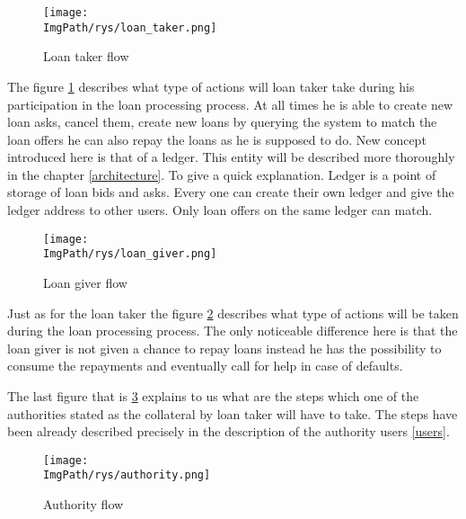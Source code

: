 \documentclass[a4paper,12pt,twoside,openany]{report}
\newcommand{\ImgPath}{.}
\begin{document}
\begin{figure}[!htbp]
	\begin{center}
\centering
\texttt{[image: \\ImgPath/rys/loan\_taker.png]}
\end{center}
	\caption{Loan taker flow}
	\label{loan taker}
\end{figure}

\newpage

The figure \ref{loan taker} describes what type of actions will loan taker take during his participation in the loan processing process. At all times he is able to create new loan asks, cancel them, create new loans by querying the system to match the loan offers he can also repay the loans as he is supposed to do. New concept introduced here is that of a ledger. This entity will be described more thoroughly in the chapter \ref{architecture}. To give a quick explanation. Ledger is a point of storage of loan bids and asks. Every one can create their own ledger and give the ledger address to other users. Only loan offers on the same ledger can match.

\begin{figure}[!htbp]
	\begin{center}
\centering
\texttt{[image: \\ImgPath/rys/loan\_giver.png]}
\end{center}
	\caption{Loan giver flow}
	\label{loan giver}
\end{figure}

Just as for the loan taker the figure \ref{loan giver} describes what type of actions will be taken during the loan processing process. The only noticeable difference here is that the loan giver is not given a chance to repay loans instead he has the possibility to consume the repayments and eventually call for help in case of defaults.

The last figure that is \ref{authority} explains to us what are the steps which one of the authorities stated as the collateral by loan taker will have to take. The steps have been already described precisely in the description of the authority users \ref{users}.


\begin{figure}[!htbp]
	\begin{center}
\centering
\texttt{[image: \\ImgPath/rys/authority.png]}
\end{center}
	\caption{Authority flow}
	\label{authority}
\end{figure}

\newpage
\end{document}
